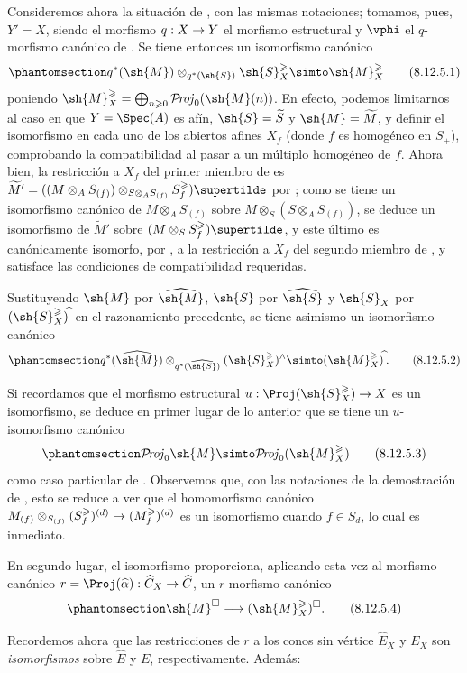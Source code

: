\documentclass[oneside,10pt]{amsart}
\makeatletter
\renewcommand{\geq}{\geqslant}
\newcommand{\ega@arrow}[2]{\mathchoice{#1}{#2}{#2}{#2}}
\renewcommand{\to}{\ega@arrow{\longrightarrow}{\rightarrow}}
\def\shProj{\mathcal{P}\!\mathit{roj}}
\newcommand{\oldpage}[2][]{\marginnote{\normalfont\footnotesize\textbf{#1}~|~#2}\ignorespaces}
\let\EGAOriginalLabel\label
\renewcommand{\label}[1]{\phantomsection\EGAOriginalLabel{#1}}
\makeatother
\begin{document}
\begin{env}[8.12.5]
\label{II.8.12.5}
Consideremos ahora la situación de , con las mismas notaciones;
tomamos, pues, $Y'=X$, siendo el morfismo $q:X\to Y$ el morfismo estructural y $\vphi$ el $q$-morfismo canónico de .
Se tiene entonces un isomorfismo canónico
\[
\label{II.8.12.5.1}
    q^*(\sh{M})\otimes_{q^*(\sh{S})}\sh{S}_X^\geq \simto \sh{M}_X^\geq
\tag{8.12.5.1}
\]
poniendo $\sh{M}_X^\geq=\bigoplus_{n\geq0}\shProj_0(\sh{M}(n))$.
En efecto, podemos limitarnos al caso en que $Y=\Spec(A)$ es afín, $\sh{S}=\widetilde{S}$ y $\sh{M}=\widetilde{M}$, y definir el isomorfismo  en cada uno de los abiertos afines $X_f$ (donde $f$ es homogéneo en $S_+$), comprobando la compatibilidad al pasar a un múltiplo homogéneo de $f$.
Ahora bien, la restricción a $X_f$ del primer miembro de  es $\widetilde{M}'=((M\otimes_A S_{(f)})\otimes_{S\otimes_A S_{(f)}}S_f^\geq)\supertilde$ por ;
como se tiene un isomorfismo canónico de $M\otimes_A S_{(f)}$ sobre $M\otimes_S(S\otimes_A S_{(f)})$, se deduce un isomorfismo de $\widetilde{M}'$ sobre $(M\otimes_S S_f^\geq)\supertilde$, y este último es canónicamente isomorfo, por , a la restricción a $X_f$ del segundo miembro de , y satisface las condiciones de compatibilidad requeridas.
\oldpage[II]{194}

Sustituyendo $\sh{M}$ por $\widehat{\sh{M}}$, $\sh{S}$ por $\widehat{\sh{S}}$ y $\sh{S}_X$ por $(\sh{S}_X^\geq)^{\widehat{\,}}$ en el razonamiento precedente, se tiene asimismo un isomorfismo canónico
\[
\label{II.8.12.5.2}
    q^*(\widehat{\sh{M}})\otimes_{q^*(\widehat{\sh{S}})}(\sh{S}_X^\geq)^\wedge \simto (\sh{M}_X^\geq)^{\widehat{\,}}.
\tag{8.12.5.2}
\]

Si recordamos  que el morfismo estructural $u:\Proj(\sh{S}_X^\geq)\to X$ es un isomorfismo, se deduce en primer lugar de lo anterior que se tiene un $u$-isomorfismo canónico
\[
\label{II.8.12.5.3}
    \shProj_0\sh{M} \simto \shProj_0(\sh{M}_X^\geq)
\tag{8.12.5.3}
\]
como caso particular de .
Observemos que, con las notaciones de la demostración de , esto se reduce a ver que el homomorfismo canónico $M_{(f)}\otimes_{S_{(f)}}(S_f^\geq)^{(d)}\to(M_f^\geq)^{(d)}$ es un isomorfismo cuando $f\in S_d$, lo cual es inmediato.

En segundo lugar, el isomorfismo  proporciona, aplicando esta vez  al morfismo canónico $r=\Proj(\widehat{\alpha}):\widehat{C}_X\to\widehat{C}$, un $r$-morfismo canónico
\[
\label{II.8.12.5.4}
    \sh{M}^\square \to (\sh{M}_X^\geq)^\square.
\tag{8.12.5.4}
\]

Recordemos ahora  que las restricciones de $r$ a los conos sin vértice $\widehat{E}_X$ y $E_X$ son \emph{isomorfismos} sobre $\widehat{E}$ y $E$, respectivamente.
Además:
\end{env}
\end{document}
